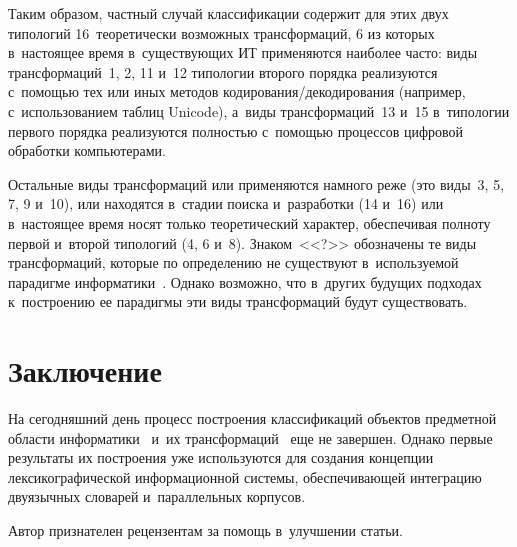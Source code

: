 \begin{multicols}{2}
  Таким образом, частный случай классификации содержит для этих двух 
типологий 16~теоретически возможных трансформаций, 6 из которых 
в~настоящее время в~существующих ИТ применяются наиболее часто: виды 
трансформаций~1, 2, 11 и~12 типологии второго порядка реализуются 
с~помощью тех или иных методов ко\-ди\-ро\-ва\-ния/де\-ко\-ди\-ро\-ва\-ния 
(например, с~использованием таблиц Unicode), а~виды трансформаций~13 и~15
 в~типологии первого порядка реализуются полностью с~по\-мощью процессов 
цифровой обработки компьютерами.
  
  Остальные виды трансформаций или применяются намного реже (это 
виды~3, 5, 7, 9 и~10), или находятся в~стадии поиска и~разработки (14 и~16) или 
в~настоящее время носят только теоретический характер, обеспечивая полноту 
первой и~второй типологий (4, 6 и~8). Знаком~<<?>> обозначены те виды 
трансформаций, которые по определению не существуют в~используемой 
парадигме информатики~\cite{30-zac}. Однако возможно, что в~других 
будущих подходах к~построению ее парадигмы эти виды трансформаций будут 
существовать.
  
\section{Заключение}

  На сегодняшний день процесс построения классификаций объектов 
предметной области информатики~\cite{22-zac} и~их  
трансформаций~\cite{23-zac} еще не завершен. Однако первые результаты их 
построения уже используются для создания концепции лексикографической 
информационной сис\-те\-мы, обеспечивающей интеграцию двуязычных 
словарей и~параллельных корпусов.
  
  \bigskip
  
  
  Автор признателен рецензентам за помощь в~улучшении статьи.
  

\end{multicols}
